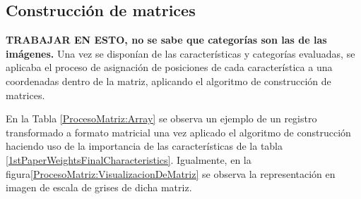 \subsection*{Construcción de matrices}

\textbf{TRABAJAR EN ESTO, no se sabe que categorías son las de las imágenes.}
Una vez se disponían de las características y categorías evaluadas, se aplicaba el proceso de asignación de posiciones de cada característica a una coordenadas dentro de la matriz, aplicando el algoritmo de construcción de matrices.

En la Tabla \ref{ProcesoMatriz:Array} se observa un ejemplo de un registro transformado a formato matricial una vez aplicado el algoritmo de construcción haciendo uso de la importancia de las características de la tabla \ref{1stPaperWeightsFinalCharacteristics}. Igualmente, en la figura\ref{ProcesoMatriz:VisualizacionDeMatriz} se observa la representación en imagen de escala de grises de dicha matriz.





